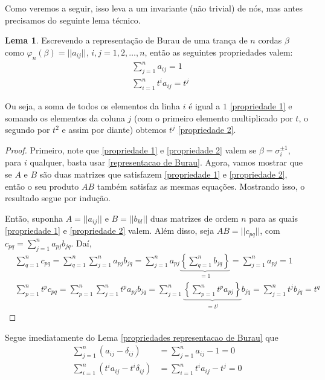 \documentclass[a4paper,portuguese,11pt,twoside, leqno]{book}
\theoremstyle{definition}
\newtheorem{lemma}[theorem]{Lema}
\begin{document}
	\par\vspace{0.3cm} Como veremos a seguir, isso leva a um invariante (não trivial) de nós, mas antes precisamos do seguinte lema técnico.
	\begin{lemma}
		\label{propriedades representacao de Burau}
		Escrevendo a representação de Burau de uma trança de $n$ cordas $\beta$ como $\varphi_n(\beta) = ||a_{ij}||$, $i,j=1,2,\dots,n$, então as seguintes propriedades valem:
		\begin{align}
		\label{propriedade 1}
		&\sum_{j=1}^{n}a_{ij} = 1 \\
		\label{propriedade 2}
		&\sum_{i=1}^{n} t^ia_{ij} = t^j 
		\end{align}
		\par Ou seja, a soma de todos os elementos da linha $i$ é igual a $1$ \eqref{propriedade 1} e somando os elementos da coluna $j$ (com o primeiro elemento multiplicado por $t$, o segundo por $t^2$ e assim por diante) obtemos $t^j$ \eqref{propriedade 2}.
	\end{lemma}
	\begin{proof}
		Primeiro, note que \eqref{propriedade 1} e \eqref{propriedade 2} valem se $\beta = \sigma_i^{\pm1}$, para $i$ qualquer, basta usar \eqref{representacao de Burau}. Agora, vamos mostrar que se $A$ e $B$ são duas matrizes que satisfazem \eqref{propriedade 1} e \eqref{propriedade 2}, então o seu produto $AB$ também satisfaz as mesmas equações. Mostrando isso, o resultado segue por indução.
		\par\vspace{0.3cm} Então, suponha $A = ||a_{ij}||$ e $B = || b_{kl} ||$ duas matrizes de ordem $n$ para as quais \eqref{propriedade 1} e \eqref{propriedade 2} valem. Além disso, seja $AB = || c_{pq} ||$, com $c_{pq} = \displaystyle{ \sum_{j=1}^{n}a_{pj}b_{jq} }$. Daí, 
		\begin{align*}
		&\sum_{q=1}^{n}c_{pq} = \sum_{q=1}^{n}\sum_{j=1}^{n}a_{pj}b_{jq} = \sum_{j=1}^{n}a_{pj}\underbrace{\left\{\sum_{q=1}^{n}b_{jq}\right\}}_{=1} =
		\sum_{j=1}^{n}a_{pj} = 1 \\
		&\sum_{p=1}^{n}t^pc_{pq} = \sum_{p=1}^{n}\sum_{j=1}^{n}t^pa_{pj}b_{jq} = \sum_{j=1}^{n}\underbrace{ \left\{ \sum_{p=1}^{n}t^pa_{pj} \right\}}_{=t^j}b_{jq} = \sum_{j=1}^{n}t^jb_{jq} = t^q
		\end{align*}	
	\end{proof}
	\par Segue imediatamente do Lema \eqref{propriedades representacao de Burau} que
	\begin{align}
	\label{consequencia 1}
	\sum_{j=1}^{n}(a_{ij} - \delta_{ij}) &= \sum_{j=1}^{n}a_{ij} - 1 = 0 \\ 
	\label{consequencia 2}
	\sum_{i=1}^{n}(t^ia_{ij} - t^i\delta_{ij}) &= \sum_{i=1}^{n}t^ia_{ij} - t^j = 0
	\end{align}
\end{document}
